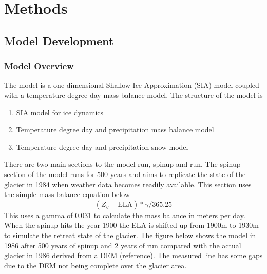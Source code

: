 \documentclass{article}
\begin{document}
\section{Methods}

\subsection{Model Development}
\subsubsection{Model Overview}

The model is a one-dimensional Shallow Ice Approximation (SIA) model coupled with a temperature degree day mass balance model. The structure 
of the model is
\begin{enumerate}
    \item SIA model for ice dynamics
    \item Temperature degree day and precipitation mass balance model
    \item Temperature degree day and precipitation snow model
\end{enumerate}

There are two main sections to the model run, spinup and run. The spinup section of the model runs for 500 years and aims to replicate the 
state of the glacier in 1984 when weather data becomes readily available. This section uses the simple mass balance equation below
\begin{equation}(Z_g-\text{ELA})*\gamma /365.25\end{equation}
This uses a gamma of 0.031 to calculate the mass balance in meters per day. When the spinup hits the year 1900 the ELA is shifted up from 1900m to 1930m to simulate the 
retreat state of the glacier. The figure below shows the model in 1986 after 500 years of spinup and 2 years of run compared with the actual 
glacier in 1986 derived from a DEM (reference). The measured line has some gaps due to the DEM not being complete over the glacier area.
\end{document}
